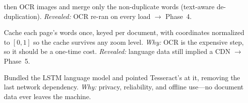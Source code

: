 \begin{description}[leftmargin=1.4em, style=nextline, itemsep=4pt]
        then OCR images and merge only the non-duplicate words (text-aware
        de-duplication). \emph{Revealed:} OCR re-ran on every load $\rightarrow$
        Phase~4.
  \item[Phase 4 --- IndexedDB caching.] Cache each page's words once, keyed per
        document, with coordinates normalized to $[0,1]$ so the cache survives
        any zoom level. \emph{Why:} OCR is the expensive step, so it should be a
        one-time cost. \emph{Revealed:} language data still implied a CDN
        $\rightarrow$ Phase~5.
  \item[Phase 5 --- Fully offline.] Bundled the LSTM language model and pointed
        Tesseract's  at it, removing the last network dependency.
        \emph{Why:} privacy, reliability, and offline use---no document data ever
        leaves the machine.
\end{description}

